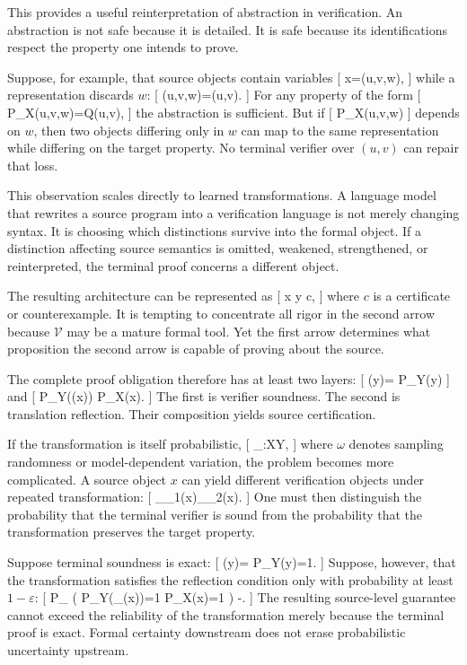 \documentclass[11pt]{article}
\begin{document}
This provides a useful reinterpretation of abstraction in verification. An abstraction is not safe because it is detailed. It is safe because its identifications respect the property one intends to prove.

Suppose, for example, that source objects contain variables
[
x=(u,v,w),
]
while a representation discards $w$:
[
\tau(u,v,w)=(u,v).
]
For any property of the form
[
P_X(u,v,w)=Q(u,v),
]
the abstraction is sufficient. But if
[
P_X(u,v,w)
]
depends on $w$, then two objects differing only in $w$ can map to the same representation while differing on the target property. No terminal verifier over $(u,v)$ can repair that loss.

This observation scales directly to learned transformations. A language model that rewrites a source program into a verification language is not merely changing syntax. It is choosing which distinctions survive into the formal object. If a distinction affecting source semantics is omitted, weakened, strengthened, or reinterpreted, the terminal proof concerns a different object.

The resulting architecture can be represented as
[
x
\xrightarrow{\tau}
y
c,
]
where $c$ is a certificate or counterexample. It is tempting to concentrate all rigor in the second arrow because $\mathcal{V}$ may be a mature formal tool. Yet the first arrow determines what proposition the second arrow is capable of proving about the source.

The complete proof obligation therefore has at least two layers:
[
(y)=
\Longrightarrow
P_Y(y)
]
and
[
P_Y(\tau(x))
\Longrightarrow
P_X(x).
]
The first is verifier soundness. The second is translation reflection. Their composition yields source certification.

If the transformation is itself probabilistic,
[
\tau_\omega:X\rightarrow Y,
]
where $\omega$ denotes sampling randomness or model-dependent variation, the problem becomes more complicated. A source object $x$ can yield different verification objects under repeated transformation:
[
\tau_{\omega_1}(x)\neq\tau_{\omega_2}(x).
]
One must then distinguish the probability that the terminal verifier is sound from the probability that the transformation preserves the target property.

Suppose terminal soundness is exact:
[
(y)=
\Longrightarrow
P_Y(y)=1.
]
Suppose, however, that the transformation satisfies the reflection condition only with probability at least $1-\varepsilon$:
[
P_\omega
\left(
P_Y(\tau_\omega(x))=1
\Longrightarrow
P_X(x)=1
\right)
-\varepsilon.
]
The resulting source-level guarantee cannot exceed the reliability of the transformation merely because the terminal proof is exact. Formal certainty downstream does not erase probabilistic uncertainty upstream.
\end{document}
